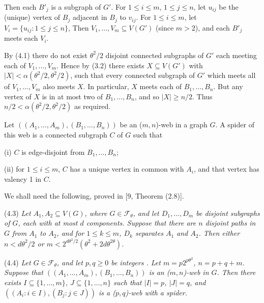Then each $B'_j$ is a subgraph of $G'$. For $1 \le i \le m$, $1 \le j \le n$, let $u_{ij}$ be the (unique) vertex of $B_j$ adjacent in $B_j$ to $v_{ij}$. For $1 \le i \le m$, let $V_i = \{u_{ij} \colon 1 \le j \le n\}$, Then $V_1, \dots, V_m \subseteq V(G')$ (since $m > 2$), and each $B'_j$ meets each $V_i$.

By (4.1) there do not exist $\theta^2/2$ disjoint connected subgraphs of $G'$ each meeting each of $V_1, \dots, V_m$. Hence by (3.2) there exists $X \subseteq V(G')$ with $|X| < \alpha(\theta^2/2, \theta^2/2)$, such that every connected subgraph of $G'$ which meets all of $V_1, \dots, V_m$ also meets $X$. In particular, $X$ meets each of $B_1, \dots, B_n$. But any vertex of $X$ is in at most two of $B_1, \dots, B_n$, and so $|X| \ge n/2$. Thus $n/2 < \alpha(\theta^2/2, \theta^2/2)$ as required.

Let $((A_1, \dots, A_m), (B_1, \dots, B_n))$ be an ($m, n$)-web in a graph $G$. A spider of this web is a connected subgraph $C$ of $G$ such that

\hspace*{12pt}(i) $C$ is edge-disjoint from $B_1, \dots, B_n$;

\hspace*{12pt}(ii) for $1 \le i \le m$, $C$ has a unique vertex in common with $A_i$, and that vertex has valency 1 in $C$.

We shall need the following, proved in [9, Theorem (2.8)].

\stmt
(4.3) \textit{Let $A_1, A_2 \subseteq V(G)$, where $G \in \mathcal{F}_\theta$, and let $D_1, \dots, D_m$ be disjoint subgraphs of $G$, each with at most $d$ components.  Suppose that there are $n$ disjoint paths in $G$ from $A_1$ to $A_2$, and for $1 \le k \le m$, $D_k$ separates $A_1$ and $A_2$. Then either $n < d\theta^2/2$ or $m < 2^{d\theta^2/2}(\theta^2 + 2d\theta^{2\theta})$.}

\stmt
(4.4) \textit{Let $G \in \mathcal{F}_\theta$, and let $p, q \ge 0$ be integers . Let $m = p 2^{p\theta^2}$, $n = p + q + m$. Suppose that $((A_1, \dots, A_m), (B_1, \dots, B_n))$ is an ($m, n$)-web in $G$. Then there exists $I \subseteq \{1, \dots, m\}$, $J \subseteq \{1, \dots, n\}$ such that $|I| = p$, $|J| = q$, and $((A_i \colon i \in I), (B_j \colon j \in J))$ is a ($p, q$)-web with a spider.}

